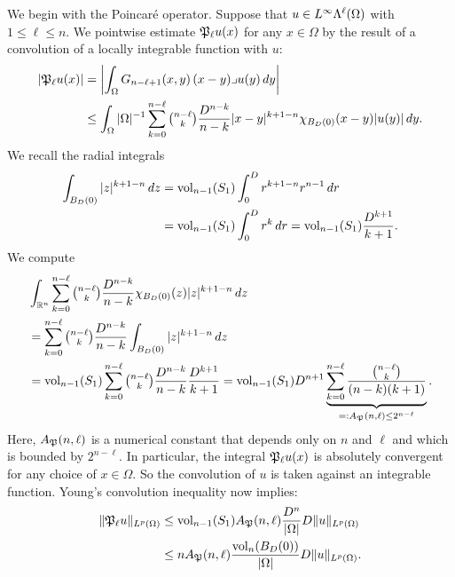 \documentclass[10pt,letterpaper]{article}
\begin{document}
We begin with the Poincar\'e operator. 
Suppose that $u \in L^{\infty}\Lambda^{\ell}(\Omega)$ with $1 \leq \ell \leq n$.
We pointwise estimate ${\mathfrak P}_{\ell} u(x)$ for any $x \in \Omega$ by the result of a convolution of a locally integrable function with $u$:
\begin{align*}
    \left| {\mathfrak P}_{\ell} u(x) \right|
    &=
    \left| 
        \int_{\Omega} G_{n-\ell+1}(x,y) \,(x-y)\lrcorner u(y)\,dy
    \right| 
    \\&\leq 
    \int_{\Omega} |\Omega|^{-1} \sum_{k=0}^{ n-\ell }\tbinom{ n-\ell }{k} \frac{ D^{n-k} }{n-k} |x-y|^{k+1-n} \chi_{B_D(0)}(x-y) |u(y)| \,dy
    .
\end{align*}
We recall the radial integrals 
\begin{align*}
    \int_{B_D(0)} |z|^{k+1-n} \,dz
    &
    =
    \operatorname{vol}_{n-1}(S_1) \int_{0}^{D} r^{k+1-n} r^{n-1} \,dr
    \\&
    =
    \operatorname{vol}_{n-1}(S_1) \int_{0}^{D} r^{k} \,dr
    =
    \operatorname{vol}_{n-1}(S_1) \frac{D^{k+1}}{k+1}
    .
\end{align*}
We compute 
\begin{align*}
    &
    \int_{{\mathbb R}^{n}} \sum_{k=0}^{n-\ell} \tbinom{n-\ell}{k} \frac{ D^{n-k} }{n-k} \chi_{B_D(0)}(z) |z|^{k+1-n} \,dz
    \\&
    =
    \sum_{k=0}^{n-\ell} \tbinom{n-\ell}{k} \frac{ D^{n-k} }{n-k} \int_{B_D(0)} |z|^{k+1-n} \,dz
    \\&
    =
    \operatorname{vol}_{n-1}(S_1) \sum_{k=0}^{n-\ell} \tbinom{n-\ell}{k} \frac{ D^{n-k} }{n-k} \frac{D^{k+1}}{k+1}
    =
    \operatorname{vol}_{n-1}(S_1) D^{n+1} \underbrace{ \sum_{k=0}^{n-\ell} \frac{ \tbinom{n-\ell}{k} }{ (n-k)(k+1) } }_{ =: A_{{\mathfrak P}}(n,\ell) \leq 2^{n-\ell}}
    .
\end{align*}
Here, $A_{{\mathfrak P}}(n,\ell)$ is a numerical constant that depends only on $n$ and $\ell$ 
and which is bounded by $2^{n-\ell}$. 
In particular, the integral ${\mathfrak P}_{\ell} u(x)$ is absolutely convergent for any choice of $x \in \Omega$. 
So the convolution of $u$ is taken against an integrable function. 
Young's convolution inequality now implies: 
\begin{align*}
    \| {\mathfrak P}_{\ell} u \|_{L^{p}(\Omega)}
    &
    \leq 
    \operatorname{vol}_{n-1}(S_1) A_{{\mathfrak P}}(n,\ell) \frac{ D^{n} }{|\Omega|} 
    D
    \| u \|_{L^{p}(\Omega)}
    \\&
    \leq 
    n A_{{\mathfrak P}}(n,\ell) \frac{ \operatorname{vol}_{n}(B_D(0)) }{|\Omega|} 
    D
    \| u \|_{L^{p}(\Omega)}
    .
\end{align*}
\end{document}
